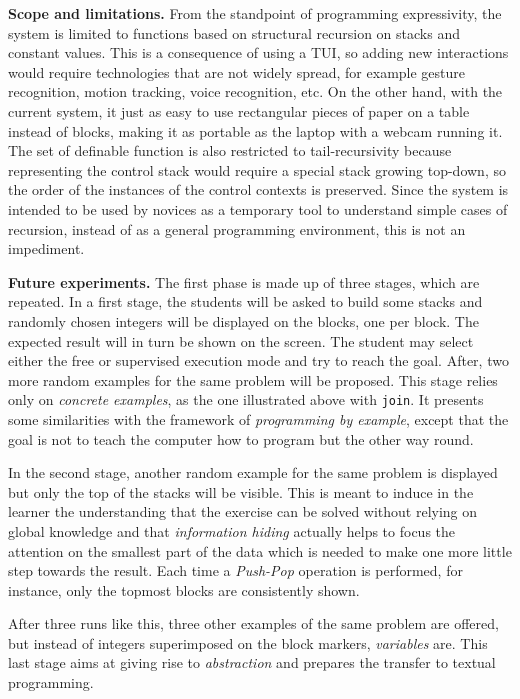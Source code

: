 \medskip

\noindent\textbf{Scope and limitations.} From the standpoint of
programming expressivity, the system is limited to functions based on
structural recursion on stacks and constant values. This is a
consequence of using a TUI, so adding new interactions would require
technologies that are not widely spread, for example gesture
recognition, motion tracking, voice recognition, etc. On the other
hand, with the current system, it just as easy to use rectangular
pieces of paper on a table instead of blocks, making it as portable as
the laptop with a webcam running it. The set of definable function is
also restricted to tail\hyp{}recursivity because representing the
control stack would require a special stack growing top\hyp{}down, so
the order of the instances of the control contexts is preserved. Since
the system is intended to be used by novices as a temporary tool to
understand simple cases of recursion, instead of as a general
programming environment, this is not an impediment.

\medskip

\noindent\textbf{Future experiments.} The first phase is made up of
three stages, which are repeated. In a first stage, the students will
be asked to build some stacks and randomly chosen integers will be
displayed on the blocks, one per block. The expected result will in
turn be shown on the screen. The student may select either the free or
supervised execution mode and try to reach the goal. After, two more
random examples for the same problem will be proposed. This stage
relies only on \emph{concrete examples}, as the one illustrated above
with \texttt{join}. It presents some similarities with the framework
of \emph{programming by example}, except that the goal is not to teach
the computer how to program but the other way round.

In the second stage, another random example for the same problem is
displayed but only the top of the stacks will be visible. This is
meant to induce in the learner the understanding that the exercise can
be solved without relying on global knowledge and that
\emph{information hiding} actually helps to focus the attention on the
smallest part of the data which is needed to make one more little step
towards the result. Each time a \textsl{Push\hyp{}Pop} operation is
performed, for instance, only the topmost blocks are consistently
shown.

After three runs like this, three other examples of the same problem
are offered, but instead of integers superimposed on the block
markers, \emph{variables} are. This last stage aims at giving rise to
\emph{abstraction} and prepares the transfer to textual programming.

